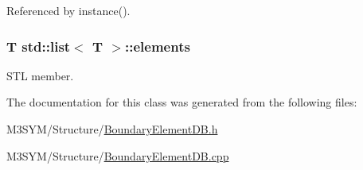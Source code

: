 Referenced by instance().

\hypertarget{classstd_1_1list_a682e5c7c91eb377d0cb4f019b2b81a5d}{
\subsubsection[{elements}]{\setlength{\rightskip}{0pt plus 5cm}T std\+::list$<$ T $>$\+::elements\hspace{0.3cm}{\ttfamily [inherited]}}}\label{classstd_1_1list_a682e5c7c91eb377d0cb4f019b2b81a5d}


S\+T\+L member. 



The documentation for this class was generated from the following files\+:\begin{DoxyCompactItemize}
\item 
M3\+S\+Y\+M/\+Structure/\hyperlink{BoundaryElementDB_8h}{Boundary\+Element\+D\+B.\+h}\item 
M3\+S\+Y\+M/\+Structure/\hyperlink{BoundaryElementDB_8cpp}{Boundary\+Element\+D\+B.\+cpp}\end{DoxyCompactItemize}
